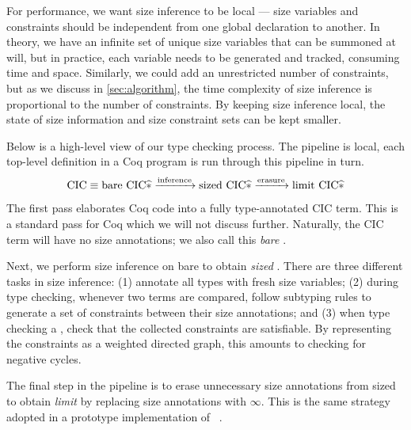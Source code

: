 For performance, we want size inference to be local --- size variables and constraints should be independent from one global declaration to another.
In theory, we have an infinite set of unique size variables that can be summoned at will, but in practice, each variable needs to be generated and tracked, consuming time and space.
Similarly, we could add an unrestricted number of constraints, but as we discuss in \autoref{sec:algorithm}, the time complexity of size inference is proportional to the number of constraints.
By keeping size inference local, the state of size information and size constraint sets can be kept smaller.

Below is a high-level view of our type checking process.
The pipeline is local, \ie each top-level definition in a Coq program is run through this pipeline in turn.
\begin{equation*}
  \text{CIC} \equiv \text{bare CIC$\widehat{\ast}$} \xrightarrow{\text{inference}} \text{sized CIC$\widehat{\ast}$} \xrightarrow{\text{erasure}} \text{limit CIC$\widehat{\ast}$}
\end{equation*}

The first pass elaborates Coq code into a fully type-annotated CIC term.
This is a standard pass for Coq which we will not discuss further.
Naturally, the CIC term will have no size annotations; we also call this \emph{bare} \lang.

Next, we perform size inference on bare \lang to obtain \emph{sized} \lang.
There are three different tasks in size inference: (1) annotate all \coinductive types with fresh size variables; (2) during type checking, whenever two terms are compared, follow subtyping rules to generate a set of constraints between their size annotations; and (3) when type checking a \cofixpoint, check that the collected constraints are satisfiable.
By representing the constraints as a weighted directed graph, this amounts to checking for negative cycles.

The final step in the pipeline is to erase unnecessary size annotations from sized \lang to obtain \emph{limit} \lang by replacing size annotations with $\infty$.
This is the same strategy adopted in a prototype implementation of \CIChatminus~\citep{cicminus}.

